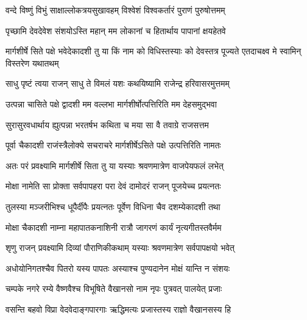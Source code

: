 \label{sec:padma-margashirsha-shukla-mokshada}

\ganapatyadiDhyanam
\padmaPuranam



\twolineshloka
{वन्दे विष्णुं विभुं साक्षाल्लोकत्रयसुखावहम्}
{विश्वेशं विश्वकर्तारं पुराणं पुरुषोत्तमम्}%

\twolineshloka
{पृच्छामि देवदेवेश संशयोऽस्ति महान् मम}
{लोकानां च हितार्थाय पापानां क्षयहेतवे}%

\threelineshloka
{मार्गशीर्षे सिते पक्षे भवेदेकादशी तु या}
{किं नाम को विधिस्तस्याः को देवस्तत्र पूज्यते}
{एतदाचक्ष्व मे स्वामिन् विस्तरेण यथातथम्}%


\twolineshloka
{साधु पृष्टं त्वया राजन् साधु ते विमलं यशः}
{कथयिष्यामि राजेन्द्र हरिवासरमुत्तमम्}%

\twolineshloka
{उत्पन्ना चासिते पक्षे द्वादशी मम वल्लभा}
{मार्गशीर्षोत्पत्तिरिति मम देहसमुद्भवा}%

\twolineshloka
{सुरासुरवधार्थाय ह्युत्पन्ना भरतर्षभ}
{कथिता च मया सा वै तवाग्रे राजसत्तम}%

\twolineshloka
{पूर्वा चैकादशी राजंस्त्रैलोक्ये सचराचरे}
{मार्गशीर्षेऽसिते पक्षे उत्पत्तिरिति नामतः}%

\twolineshloka
{अतः परं प्रवक्ष्यामि मार्गशीर्षे सिता तु या}
{यस्याः श्रवणमात्रेण वाजपेयफलं लभेत्}%

\twolineshloka
{मोक्षा नामेति सा प्रोक्ता सर्वपापहरा परा}
{देवं दामोदरं राजन् पूजयेच्च प्रयत्नतः}%

\twolineshloka
{तुलस्या मञ्जरीभिश्च धूपैर्दीपैः प्रयत्नतः}
{पूर्वेण विधिना चैव दशम्येकादशी तथा}%

\twolineshloka
{मोक्षा चैकादशी नाम्ना महापातकनाशिनी}
{रात्रौ जागरणं कार्यं नृत्यगीतस्तवैर्मम}%

\twolineshloka
{शृणु राजन् प्रवक्ष्यामि दिव्यां पौराणिकीकथाम्}
{यस्याः श्रवणमात्रेण सर्वपापक्षयो भवेत्}%

\twolineshloka
{अधोयोनिगतश्चैव पितरो यस्य पापतः}
{अस्याश्च पुण्यदानेन मोक्षं यान्ति न संशयः}%

\twolineshloka
{चम्पके नगरे रम्ये वैष्णवैश्च विभूषिते}
{वैखानसो नाम नृपः पुत्रवत् पालयेत् प्रजाः}%

\twolineshloka
{वसन्ति बहवो विप्रा वेदवेदाङ्गपारगाः}
{ऋद्धिमत्यः प्रजास्तस्य राज्ञो वैखानसस्य हि}%

